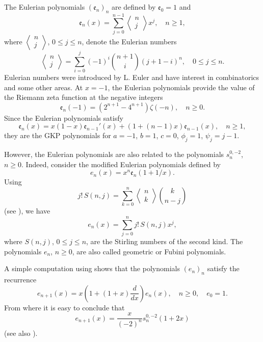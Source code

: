 \documentclass[10pt, a4paper, leqno]{amsart}
\numberwithin{equation}{section}
\theoremstyle{plain}
\theoremstyle{remark}
\newcommand{\Ee}{\mathfrak{e}}
\begin{document}
The Eulerian polynomials $(\Ee_n)_n$ are defined by $\Ee_0=1$ and
\begin{equation*}
  \Ee_n(x) = \sum_{j=0}^{n-1} \left\langle \begin{matrix} n \\ j \end{matrix} \right\rangle x^j,
  \quad n\ge 1,
\end{equation*}
where $\left\langle \begin{smallmatrix} n \\ j \end{smallmatrix} \right\rangle$, $0\le j\le n$, denote the Eulerian numbers
\[
  \left\langle \begin{matrix} n \\ j \end{matrix} \right\rangle
  = \sum_{i=0}^j(-1)^{i}\binom{n+1}{i}(j+1-i)^n,
  \quad 0\le j\le n.
\]
Eulerian numbers were introduced by L. Euler \cite{Eul} and have interest in combinatorics and some other areas.
At $x=-1$, the Eulerian polynomials provide the value of the Riemann zeta function at the negative integers
\[
  \Ee_n(-1) = (2^{n+1}-4^{n+1})\zeta(-n),\quad n\ge 0.
\]
Since the Eulerian polynomials satisfy
\[
  \Ee_n(x) = x(1-x)\Ee_{n-1}'(x)+(1+(n-1)x)\Ee_{n-1}(x), \quad n\ge 1,
\]
they are the GKP polynomials for $a=-1$, $b=1$, $c=0$, $\phi_j=1$, $\psi_j=j-1$.

However, the Eulerian polynomials are also related to the polynomials $s_{n}^{0,-2}$, $n\ge 0$. Indeed, consider the modified Eulerian polynomials defined by
\begin{equation*}
  e_n(x) = x^n\Ee_n(1+1/x).
\end{equation*}
Using
\[
  j!\, S(n,j) = \sum_{k=0}^n \left\langle \begin{matrix} n \\ k \end{matrix} \right\rangle \binom{k}{n-j}
\]
(see \cite[(6.39), p.~269]{Knuth-libro}), we have
\begin{equation*}
  e_n(x) = \sum_{j=0}^n j!\, S(n,j)x^j,
\end{equation*}
where $S(n,j)$, $0\le j\le n$, are the Stirling numbers of the second kind. The polynomials $e_n$, $n\ge 0$, are also called geometric or Fubini polynomials.

A simple computation using \cite[(7a), p.~10]{Hir} shows that the polynomials $(e_n)_n$ satisfy
the recurrence
\begin{equation*}
  e_{n+1}(x) = x\left(1+(1+x)\frac{d}{dx}\right)e_n(x),\quad n\ge 0, \quad e_0=1.
\end{equation*}
From where it is easy to conclude that
\begin{equation*}
  e_{n+1}(x) = \frac{x}{(-2)^{n}}s_{n}^{0,-2}(1+2x)
\end{equation*}
(see also \cite{Boy, dzb}).
\end{document}
